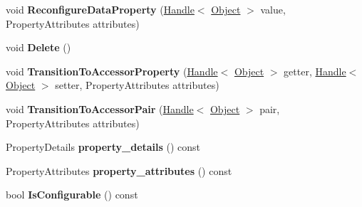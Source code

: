 \begin{DoxyCompactItemize}
\item 
void {\bfseries Reconfigure\+Data\+Property} (\hyperlink{classv8_1_1internal_1_1_handle}{Handle}$<$ \hyperlink{classv8_1_1internal_1_1_object}{Object} $>$ value, Property\+Attributes attributes)\hypertarget{classv8_1_1internal_1_1_b_a_s_e___e_m_b_e_d_d_e_d_a858250f799803d06173c47f986917712}{}\label{classv8_1_1internal_1_1_b_a_s_e___e_m_b_e_d_d_e_d_a858250f799803d06173c47f986917712}

\item 
void {\bfseries Delete} ()\hypertarget{classv8_1_1internal_1_1_b_a_s_e___e_m_b_e_d_d_e_d_a59fedb5e46140c393ec757a803ed1f16}{}\label{classv8_1_1internal_1_1_b_a_s_e___e_m_b_e_d_d_e_d_a59fedb5e46140c393ec757a803ed1f16}

\item 
void {\bfseries Transition\+To\+Accessor\+Property} (\hyperlink{classv8_1_1internal_1_1_handle}{Handle}$<$ \hyperlink{classv8_1_1internal_1_1_object}{Object} $>$ getter, \hyperlink{classv8_1_1internal_1_1_handle}{Handle}$<$ \hyperlink{classv8_1_1internal_1_1_object}{Object} $>$ setter, Property\+Attributes attributes)\hypertarget{classv8_1_1internal_1_1_b_a_s_e___e_m_b_e_d_d_e_d_aabf4e80e4bebd50f29ac72f699f19e7f}{}\label{classv8_1_1internal_1_1_b_a_s_e___e_m_b_e_d_d_e_d_aabf4e80e4bebd50f29ac72f699f19e7f}

\item 
void {\bfseries Transition\+To\+Accessor\+Pair} (\hyperlink{classv8_1_1internal_1_1_handle}{Handle}$<$ \hyperlink{classv8_1_1internal_1_1_object}{Object} $>$ pair, Property\+Attributes attributes)\hypertarget{classv8_1_1internal_1_1_b_a_s_e___e_m_b_e_d_d_e_d_a2e015adda902aa8f580b756f0286a24b}{}\label{classv8_1_1internal_1_1_b_a_s_e___e_m_b_e_d_d_e_d_a2e015adda902aa8f580b756f0286a24b}

\item 
Property\+Details {\bfseries property\+\_\+details} () const \hypertarget{classv8_1_1internal_1_1_b_a_s_e___e_m_b_e_d_d_e_d_a038d3aa735c03b6224964f147cdee896}{}\label{classv8_1_1internal_1_1_b_a_s_e___e_m_b_e_d_d_e_d_a038d3aa735c03b6224964f147cdee896}

\item 
Property\+Attributes {\bfseries property\+\_\+attributes} () const \hypertarget{classv8_1_1internal_1_1_b_a_s_e___e_m_b_e_d_d_e_d_ac58f2ccfac8bd840ead5e875498e66db}{}\label{classv8_1_1internal_1_1_b_a_s_e___e_m_b_e_d_d_e_d_ac58f2ccfac8bd840ead5e875498e66db}

\item 
bool {\bfseries Is\+Configurable} () const \hypertarget{classv8_1_1internal_1_1_b_a_s_e___e_m_b_e_d_d_e_d_a99a61f011620e512380b254d376c58a6}{}\label{classv8_1_1internal_1_1_b_a_s_e___e_m_b_e_d_d_e_d_a99a61f011620e512380b254d376c58a6}


\end{DoxyCompactItemize}
